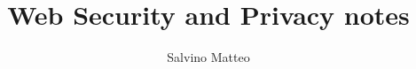 \documentclass[11pt]{article}
\title{Web Security and Privacy notes}
\author{Salvino Matteo}
\date{}
\begin{document}
\maketitle
\pagebreak

\tableofcontents
\pagebreak






\end{document}
